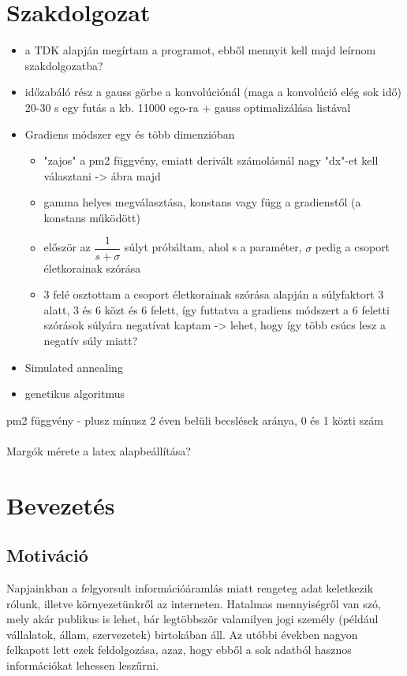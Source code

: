 \documentclass[12pt]{article}
\begin{document}
\section*{Szakdolgozat}
\begin{itemize}
	\item a TDK alapján megírtam a programot, ebből mennyit kell majd leírnom szakdolgozatba?
	\item időzabáló rész a gauss görbe a konvolúciónál (maga a konvolúció elég sok idő) 20-30 s egy futás a kb. 11000 ego-ra + gauss optimalizálása listával
	\item Gradiens módszer egy és több dimenzióban
	\begin{itemize}
		\item "zajos" a pm2 függvény, emiatt derivált számolásnál nagy "dx"-et kell választani -> ábra majd
		\item gamma helyes megválasztása, konstans vagy függ a gradienstől (a konstans működött)
		\item először az $\dfrac{1}{s + \sigma}$ súlyt próbáltam, ahol s a paraméter, $\sigma$ pedig a csoport életkorainak szórása
		\item 3 felé osztottam a csoport életkorainak szórása alapján a súlyfaktort 3 alatt, 3 és 6 közt és 6 felett, így futtatva a gradiens módszert a 6 feletti szórások súlyára negatívat kaptam -> lehet, hogy így több csúcs lesz a negatív súly miatt?
	\end{itemize}
	\item Simulated annealing
	\item genetikus algoritmus
\end{itemize}
pm2 függvény - plusz mínusz 2 éven belüli becslések aránya, 0 és 1 közti szám \\ \\
Margók mérete a latex alapbeállítása?
\fi
\pagebreak
\tableofcontents
\pagebreak
\section{Bevezetés}
\subsection{Motiváció}
Napjainkban a felgyorsult információáramlás miatt rengeteg adat keletkezik rólunk, illetve környezetünkről az interneten. %
Hatalmas mennyiségről van szó, mely akár publikus is lehet, bár legtöbbször valamilyen jogi személy (például vállalatok, állam, szervezetek) birtokában áll. Az utóbbi években nagyon felkapott lett ezek feldolgozása, azaz, hogy ebből a sok adatból hasznos információkat lehessen leszűrni.
\end{document}
